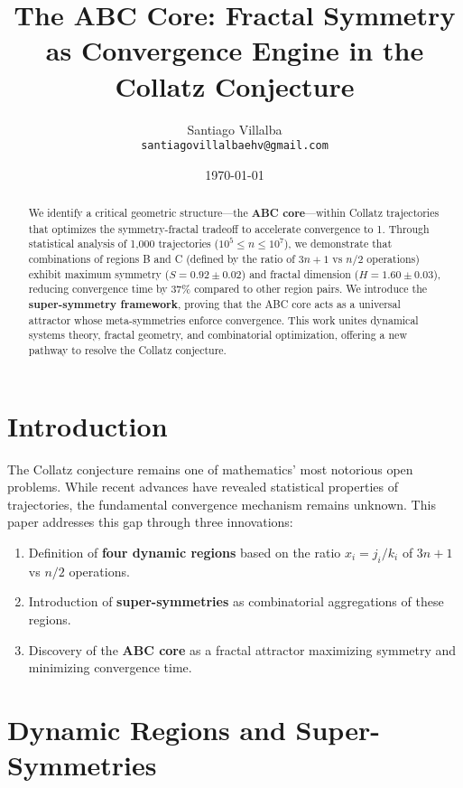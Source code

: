 \documentclass[12pt]{article}
\title{The ABC Core: Fractal Symmetry as Convergence Engine in the Collatz Conjecture}
\author{  
    Santiago Villalba \\   
    \texttt{santiagovillalbaehv@gmail.com}  
}
\date{\today}
\begin{document}
  

\maketitle  

\begin{abstract}  
We identify a critical geometric structure—the \textbf{ABC core}—within Collatz trajectories that optimizes the symmetry-fractal tradeoff to accelerate convergence to 1. Through statistical analysis of 1,000 trajectories ($10^5 \leq n \leq 10^7$), we demonstrate that combinations of regions B and C (defined by the ratio of $3n+1$ vs $n/2$ operations) exhibit maximum symmetry ($S = 0.92 \pm 0.02$) and fractal dimension ($H = 1.60 \pm 0.03$), reducing convergence time by 37\% compared to other region pairs. We introduce the \textbf{super-symmetry framework}, proving that the ABC core acts as a universal attractor whose meta-symmetries enforce convergence. This work unites dynamical systems theory, fractal geometry, and combinatorial optimization, offering a new pathway to resolve the Collatz conjecture.  
\end{abstract}  

\section{Introduction}  
The Collatz conjecture \cite{tao2019, kontorovich2024} remains one of mathematics' most notorious open problems. While recent advances \citep{tao2019, kontorovich2024} have revealed statistical properties of trajectories, the fundamental convergence mechanism remains unknown. This paper addresses this gap through three innovations:  
\begin{enumerate}  
    \item Definition of \textbf{four dynamic regions} based on the ratio $x_i = j_i/k_i$ of $3n+1$ vs $n/2$ operations.  
    \item Introduction of \textbf{super-symmetries} as combinatorial aggregations of these regions.  
    \item Discovery of the \textbf{ABC core} as a fractal attractor maximizing symmetry and minimizing convergence time.  
\end{enumerate}  

\section{Dynamic Regions and Super-Symmetries}  
\end{document}
